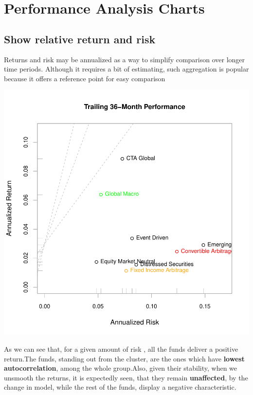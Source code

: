 \documentclass[12pt,letterpaper,english]{article}
\begin{document}
\section{Performance Analysis Charts}
\subsection{Show relative return and risk}

Returns and risk may be annualized as a way to simplify comparison
over longer time periods. Although it requires a bit of estimating,
such aggregation is popular because it offers a reference point for
easy comparison

\includegraphics{UnSmoothReturnAnalysis-Graph3}

As we can see that, for a given amount of risk , all the funds deliver a positive return.The funds, standing out from the cluster, are the ones which have \textbf{lowest autocorrelation}, among the whole group.Also, given their stability, when we unsmooth the returns, it is expectedly seen, that they remain \textbf{unaffected}, by the change in model, while the rest of the funds, display a negative characteristic.
\end{document}
